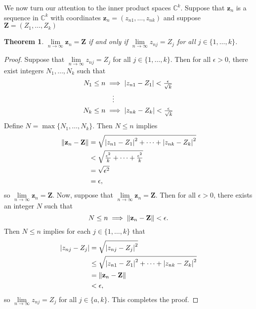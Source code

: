 \documentclass[11pt]{article}
\renewcommand{\vec}[1]{\mathbf{#1}}
\newtheorem{theorem}{Theorem}
\begin{document}
We now turn our attention to the inner product spaces $\mathbb{C}^{k}$. Suppose that $\vec{z}_{n}$ is a sequence in $\mathbb{C}^{k}$ with coordinates $\vec{z}_{n} = (z_{n1}, \ldots, z_{nk})$ and suppose $\vec{Z} = (Z_{1}, \ldots, Z_{k})$

\begin{theorem}
  $\lim\limits_{n \to \infty} \vec{z}_{n} = \vec{Z}$ if and only if $\lim\limits_{n \to \infty} z_{nj} = Z_{j}$ for all $j \in \{ 1, \ldots, k \}$.
\end{theorem}
\begin{adjustwidth}{0.5cm}{}
	\begin{proof}
		Suppose that $\lim\limits_{n \to \infty} z_{nj} = Z_{j}$ for all $j \in \{ 1, \ldots, k \}$. Then for all $\epsilon > 0$, there exist integers $N_{1}, \ldots, N_{k}$ such that
		\begin{align*}
			N_{1} \le n & \implies \abs{z_{n1} - Z_{1}} < \tfrac{\epsilon}{\sqrt{k}} \\
			            & \quad \vdots                                               \\
			N_{k} \le n & \implies \abs{z_{nk} - Z_{k}} < \tfrac{\epsilon}{\sqrt{k}}
		\end{align*}
		Define $N = \max \{ N_{1}, \ldots, N_{k} \}$. Then $N \le n$ implies
		\begin{align*}
			\norm{\vec{z}_{n} - \vec{Z}} & = \sqrt{\abs{z_{n1} - Z_{1}}^{2} + \cdots + \abs{z_{nk} - Z_{k}}^{2}} \\
			                             & < \sqrt{\tfrac{\epsilon^{2}}{k} + \cdots + \tfrac{\epsilon^{2}}{k}}   \\
			                             & = \sqrt{\epsilon^{2}}                                                 \\
			                             & = \epsilon,
		\end{align*}
		so $\lim\limits_{n \to \infty} \vec{z}_{n} = \vec{Z}$. Now, suppose that $\lim\limits_{n \to \infty} \vec{z}_{n} = \vec{Z}$. Then for all $\epsilon > 0$, there exists an integer $N$ such that
		\[
			N \le n \implies \norm{\vec{z}_{n} - \vec{Z}} < \epsilon.
		\]
		Then $N \le n$ implies for each $j \in \{ 1, \ldots, k \}$ that
		\begin{align*}
			\abs{z_{nj} - Z_{j}} & = \sqrt{\abs{z_{nj} - Z_{j}}^{2}}                                       \\
			                     & \le \sqrt{\abs{z_{n1} - Z_{1}}^{2} + \cdots + \abs{z_{nk} - Z_{k}}^{2}} \\
			                     & = \norm{\vec{z}_{n} - \vec{Z}}                                          \\
			                     & < \epsilon,
		\end{align*}
		so $\lim\limits_{n \to \infty} z_{nj} = Z_{j}$ for all $j \in \{ a, k \}$. This completes the proof.
	\end{proof}
\end{adjustwidth}
\end{document}
